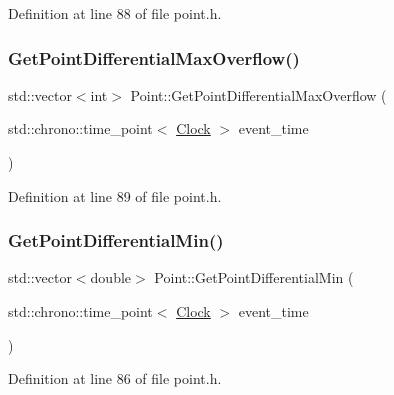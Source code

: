 Definition at line 88 of file point.\+h.

\mbox{\label{class_point_a2d38599722fbf65afe2b9ac57b0c4bcf}} 
\subsubsection{\texorpdfstring{Get\+Point\+Differential\+Max\+Overflow()}{GetPointDifferentialMaxOverflow()}}
{\footnotesize\ttfamily std\+::vector$<$int$>$ Point\+::\+Get\+Point\+Differential\+Max\+Overflow (\begin{DoxyParamCaption}\item[{std\+::chrono\+::time\+\_\+point$<$ \mbox{\hyperlink{universe_8h_a0ef8d951d1ca5ab3cfaf7ab4c7a6fd80}{Clock}} $>$}]{event\+\_\+time }\end{DoxyParamCaption})\hspace{0.3cm}{\ttfamily [inline]}}



Definition at line 89 of file point.\+h.

\mbox{\label{class_point_a782860849006b601600f8df15af23f7a}} 
\subsubsection{\texorpdfstring{Get\+Point\+Differential\+Min()}{GetPointDifferentialMin()}}
{\footnotesize\ttfamily std\+::vector$<$double$>$ Point\+::\+Get\+Point\+Differential\+Min (\begin{DoxyParamCaption}\item[{std\+::chrono\+::time\+\_\+point$<$ \mbox{\hyperlink{universe_8h_a0ef8d951d1ca5ab3cfaf7ab4c7a6fd80}{Clock}} $>$}]{event\+\_\+time }\end{DoxyParamCaption})\hspace{0.3cm}{\ttfamily [inline]}}



Definition at line 86 of file point.\+h.

\mbox{\label{class_point_adbc225afbd532763617db1acdb81ef4c}} 
